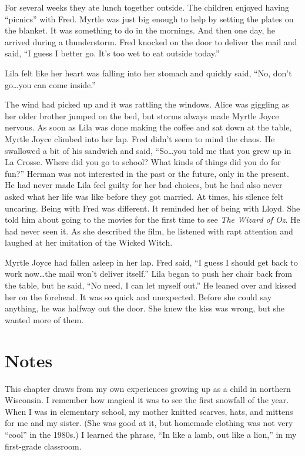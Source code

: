 \documentclass[
  american,
  letterpaper,
]{book}
\begin{document}
For several weeks they ate lunch together outside. The children enjoyed
having ``picnics'' with Fred. Myrtle was just big enough to help by
setting the plates on the blanket. It was something to do in the
mornings. And then one day, he arrived during a thunderstorm. Fred
knocked on the door to deliver the mail and said, ``I guess I better go.
It's too wet to eat outside today.''

Lila felt like her heart was falling into her stomach and quickly said,
``No, don't go\ldots you can come inside.''

The wind had picked up and it was rattling the windows. Alice was
giggling as her older brother jumped on the bed, but storms always made
Myrtle Joyce nervous. As soon as Lila was done making the coffee and sat
down at the table, Myrtle Joyce climbed into her lap. Fred didn't seem
to mind the chaos. He swallowed a bit of his sandwich and said,
``So\ldots you told me that you grew up in La Crosse. Where did you go
to school? What kinds of things did you do for fun?'' Herman was not
interested in the past or the future, only in the present. He had never
made Lila feel guilty for her bad choices, but he had also never asked
what her life was like before they got married. At times, his silence
felt uncaring. Being with Fred was different. It reminded her of being
with Lloyd. She told him about going to the movies for the first time to
see \emph{The Wizard of Oz}. He had never seen it. As she described the
film, he listened with rapt attention and laughed at her imitation of
the Wicked Witch.

Myrtle Joyce had fallen asleep in her lap. Fred said, ``I guess I should
get back to work now\ldots the mail won't deliver itself.'' Lila began
to push her chair back from the table, but he said, ``No need, I can let
myself out.'' He leaned over and kissed her on the forehead. It was so
quick and unexpected. Before she could say anything, he was halfway out
the door. She knew the kiss was wrong, but she wanted more of them.

\section{Notes}\label{notes-43}

This chapter draws from my own experiences growing up as a child in
northern Wisconsin. I remember how magical it was to see the first
snowfall of the year. When I was in elementary school, my mother knitted
scarves, hats, and mittens for me and my sister. (She was good at it,
but homemade clothing was not very ``cool'' in the 1980s.) I learned the
phrase, ``In like a lamb, out like a lion,'' in my first-grade
classroom.
\end{document}
